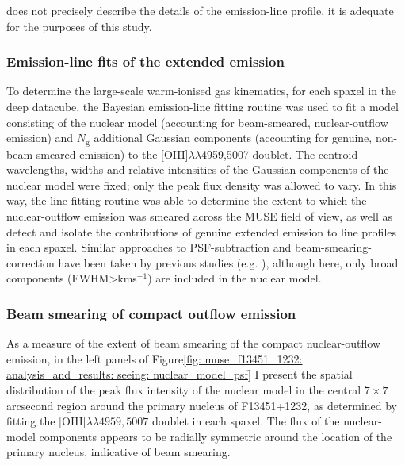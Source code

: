 does not precisely describe the details of the emission-line profile, it is adequate for the purposes of this study.

\subsubsection{Emission-line fits of the extended emission}
\label{section: muse_f13451_1232: analysis_and_results: seeing: extended_emission_fits}

To determine the large-scale warm-ionised gas kinematics, for each spaxel in the deep datacube, the Bayesian emission-line fitting routine was used to fit a model consisting of the nuclear model (accounting for beam-smeared, nuclear-outflow emission) and $N_\mathrm{g}$ additional Gaussian components (accounting for genuine, non-beam-smeared emission) to the [OIII]$\lambda\lambda$4959,5007 doublet. The centroid wavelengths, widths and relative intensities of the Gaussian components of the nuclear model were fixed; only the peak flux density was allowed to vary. In this way, the line-fitting routine was able to determine the extent to which the nuclear-outflow emission was smeared across the MUSE field of view, as well as detect and isolate the contributions of genuine extended emission to line profiles in each spaxel. Similar approaches to PSF-subtraction and beam-smearing-correction have been taken by previous studies (e.g. \citealt{Carniani2015, Kakkad2020, Speranza2024}), although here, only broad components (FWHM\;\textgreater{}\;km\;s$^{-1}$) are included in the nuclear model.

\subsubsection{Beam smearing of compact outflow emission}
\label{section: muse_f13451_1232: analysis_and_results: seeing: psf}

As a measure of the extent of beam smearing of the compact nuclear-outflow emission, in the left panels of Figure\;\ref{fig: muse_f13451_1232: analysis_and_results: seeing: nuclear_model_psf} I present the spatial distribution of the peak flux intensity of the nuclear model in the central $7\times7$\;arcsecond region around the primary nucleus of F13451+1232, as determined by fitting the [OIII]$\lambda\lambda4959,5007$ doublet in each spaxel. The flux of the nuclear-model components appears to be radially symmetric around the location of the primary nucleus, indicative of beam smearing.

